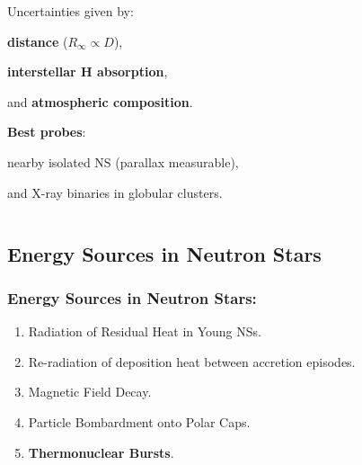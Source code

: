 \begin{frame}
\begin{columns}[c]
\begin{column}{0.6\textwidth}
\begin{enumerate}
{\item  Uncertainties given by:
\begin{itemize}\scriptsize{
 \item {\bf distance} ($R_{\infty} \propto D$),
 \item  {\bf interstellar H absorption},
 \item and {\bf atmospheric composition}. }
\end{itemize}

\quad

\item {\bf Best probes}: 
\begin{itemize}\scriptsize{
 \item nearby isolated NS (parallax measurable),
 \item and X-ray binaries in globular clusters.
}\end{itemize}

}
\end{enumerate}
 \end{column}
 \end{columns}
\end{frame}





\subsection*{Energy Sources in Neutron Stars}

\begin{frame}
\frametitle{Energy Sources in Neutron Stars:}  
\begin{enumerate}
 \item Radiation of Residual Heat in Young NSs.
 
 \quad
 
 \item Re-radiation of deposition heat between accretion episodes.
 
 \quad
 
 \item Magnetic Field Decay.
 
 \quad

 \item Particle Bombardment onto Polar Caps.
 
  \quad
 
 \item {\bf Thermonuclear Bursts}.
 
\end{enumerate}
\end{frame}







